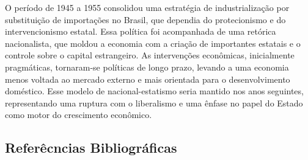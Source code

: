 \documentclass[a4paper,12pt]{article}[abntex2]
\begin{document}
O período de 1945 a 1955 consolidou uma estratégia de industrialização por substituição de importações no Brasil, que dependia do protecionismo e do intervencionismo estatal. Essa política foi acompanhada de uma retórica nacionalista, que moldou a economia com a criação de importantes estatais e o controle sobre o capital estrangeiro. As intervenções econômicas, inicialmente pragmáticas, tornaram-se políticas de longo prazo, levando a uma economia menos voltada ao mercado externo e mais orientada para o desenvolvimento doméstico. Esse modelo de nacional-estatismo seria mantido nos anos seguintes, representando uma ruptura com o liberalismo e uma ênfase no papel do Estado como motor do crescimento econômico.


\newpage

\subsection{\textbf{Referêcncias Bibliográficas}}
\end{document}
